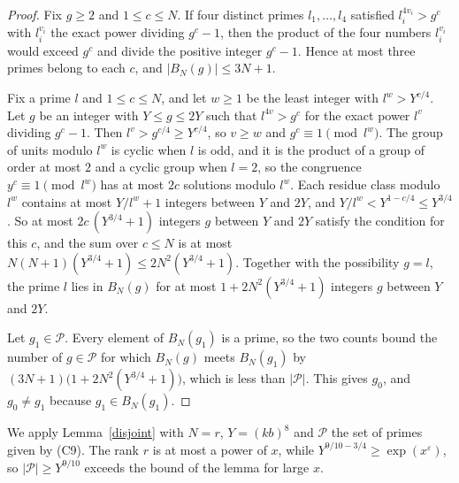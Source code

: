 \begin{proof}
Fix $g\ge2$ and $1\le c\le N$. If four distinct primes $l_1,\dots,l_4$ satisfied $l_i^{4v_i}>g^{c}$ with $l_i^{v_i}$ the exact power dividing $g^{c}-1$, then the product of the four numbers $l_i^{v_i}$ would exceed $g^{c}$ and divide the positive integer $g^{c}-1$. Hence at most three primes belong to each $c$, and $\lvert B_N(g)\rvert\le3N+1$.

Fix a prime $l$ and $1\le c\le N$, and let $w\ge1$ be the least integer with $l^{w}>Y^{c/4}$. Let $g$ be an integer with $Y\le g\le2Y$ such that $l^{4v}>g^{c}$ for the exact power $l^{v}$ dividing $g^{c}-1$. Then $l^{v}>g^{c/4}\ge Y^{c/4}$, so $v\ge w$ and $g^{c}\equiv1\pmod{l^{w}}$. The group of units modulo $l^{w}$ is cyclic when $l$ is odd, and it is the product of a group of order at most $2$ and a cyclic group when $l=2$, so the congruence $y^{c}\equiv1\pmod{l^{w}}$ has at most $2c$ solutions modulo $l^{w}$. Each residue class modulo $l^{w}$ contains at most $Y/l^{w}+1$ integers between $Y$ and $2Y$, and $Y/l^{w}<Y^{1-c/4}\le Y^{3/4}$. So at most $2c\,(Y^{3/4}+1)$ integers $g$ between $Y$ and $2Y$ satisfy the condition for this $c$, and the sum over $c\le N$ is at most $N(N+1)(Y^{3/4}+1)\le2N^2(Y^{3/4}+1)$. Together with the possibility $g=l$, the prime $l$ lies in $B_N(g)$ for at most $1+2N^2(Y^{3/4}+1)$ integers $g$ between $Y$ and $2Y$.

Let $g_1\in\mathcal P$. Every element of $B_N(g_1)$ is a prime, so the two counts bound the number of $g\in\mathcal P$ for which $B_N(g)$ meets $B_N(g_1)$ by $(3N+1)\big(1+2N^2(Y^{3/4}+1)\big)$, which is less than $\lvert\mathcal P\rvert$. This gives $g_0$, and $g_0\ne g_1$ because $g_1\in B_N(g_1)$.
\end{proof}

We apply Lemma~\ref{disjoint} with $N=r$, $Y=(kb)^8$ and $\mathcal P$ the set of primes given by (C9). The rank $r$ is at most a power of $x$, while $Y^{9/10-3/4}\ge\exp(x^{\varepsilon})$, so $\lvert\mathcal P\rvert\ge Y^{9/10}$ exceeds the bound of the lemma for large $x$.
